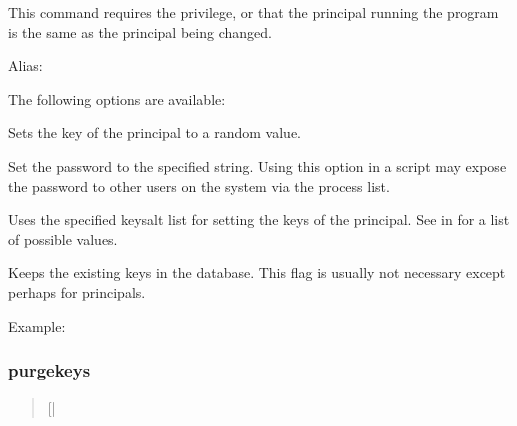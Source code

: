 \documentclass[letterpaper,10pt,english]{sphinxmanual}
\begin{document}
\sphinxAtStartPar
This command requires the  privilege, or that the
principal running the program is the same as the principal being
changed.

\sphinxAtStartPar
Alias: 

\sphinxAtStartPar
The following options are available:
\begin{description}
\sphinxAtStartPar
Sets the key of the principal to a random value.

\sphinxAtStartPar
Set the password to the specified string.  Using this option in a
script may expose the password to other users on the system via
the process list.

\sphinxAtStartPar
Uses the specified keysalt list for setting the keys of the
principal.  See {\hyperref[\detokenize{admin/conf_files/kdc_conf:keysalt-lists}]{}} in {\hyperref[\detokenize{admin/conf_files/kdc_conf:kdc-conf-5}]{}} for a
list of possible values.

\sphinxAtStartPar
Keeps the existing keys in the database.  This flag is usually not
necessary except perhaps for  principals.

\end{description}

\sphinxAtStartPar
Example:

\begin{sphinxVerbatim}[commandchars=\\\{\}]
  
    
    
   
\end{sphinxVerbatim}


\subsubsection{purgekeys}
\label{\detokenize{admin/admin_commands/kadmin_local:purgekeys}}\label{\detokenize{admin/admin_commands/kadmin_local:id7}}\begin{quote}

\sphinxAtStartPar
{} {[}| \sphinxstyleemphasis{oldest\_kvno\_to\_keep}{]} 
\end{quote}
\end{document}

